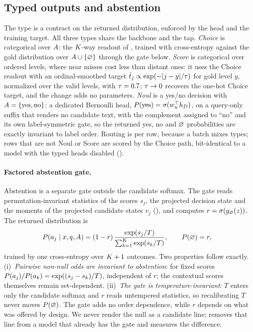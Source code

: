 \subsection{Typed outputs and abstention}
\label{sec:method:typed}

The type is a contract on the returned distribution, enforced by the head and the training target. All
three types share the backbone and the tap. \emph{Choice} is categorical over $A$: the
$K$-way readout of , trained with cross-entropy against the gold distribution
over $A \cup \{\varnothing\}$ through the gate below. \emph{Score} is categorical over ordered levels,
where near misses cost less than distant ones: it uses the Choice readout with an ordinal-smoothed target
$\tilde{t}_j \propto \exp(-|j - y|/\tau)$ for gold level $y$, normalized over the valid levels, with
$\tau = 0.7$; $\tau \to 0$ recovers the one-hot Choice target, and the change adds no parameters.
\emph{Noul} is a yes/no decision with $A = \{\text{yes}, \text{no}\}$: a dedicated Bernoulli head,
$P(\text{yes}) = \sigma(w_n^{\top} h_D)$, on a query-only suffix that renders no candidate text, with the
complement assigned to ``no'' and its own label-symmetric gate, so the returned yes, no and $\varnothing$
probabilities are exactly invariant to label order. Routing is per row, because a batch mixes types; rows
that are not Noul or Score are scored by the Choice path, bit-identical to a model with the typed heads
disabled ().

\paragraph{Factored abstention gate.}
\label{sec:method:null}
Abstention is a separate gate outside the candidate softmax. The gate reads permutation-invariant
statistics of the scores $s_j$, the projected decision state and the moments of the projected candidate
states $v_j$ (), and computes $r = \sigma(g_\varnothing(z))$. The returned
distribution is
\begin{equation}
  \label{eq:factored-null}
  P(a_{j} \mid x, q, A) = (1-r)\,\frac{\exp(s_j/T)}{\sum_{k=1}^{K}\exp(s_k/T)},
  \qquad
  P(\varnothing) = r,
\end{equation}
trained by one cross-entropy over $K + 1$ outcomes. Two properties follow exactly.
(i)~\emph{Pairwise non-null odds are invariant to abstention}: for fixed scores
$P(a_{j})/P(a_{k}) = \exp((s_j - s_k)/T)$, independent of $r$; the contextual scores themselves
remain set-dependent. (ii)~\emph{The gate is temperature-invariant}: $T$ enters only the candidate softmax
and $r$ reads untempered statistics, so recalibrating $T$ never moves $P(\varnothing)$. The gate adds no order
dependence, while $r$ depends on what was offered by design. We never render the null as a candidate
line;  removes that line from a model that already has the gate and measures the
difference.

